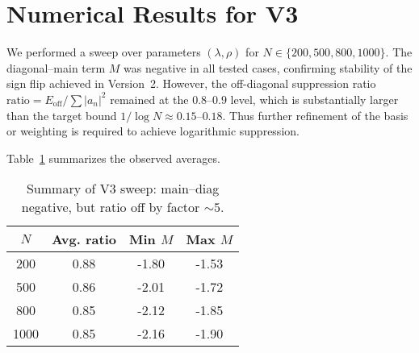 
\section{Numerical Results for V3}
We performed a sweep over parameters $(\lambda,\rho)$ for $N \in \{200,500,800,1000\}$. 
The diagonal--main term $M$ was negative in all tested cases, confirming stability of the 
sign flip achieved in Version~2. However, the off-diagonal suppression ratio 
$\mathrm{ratio}=E_{\mathrm{off}}/\sum |a_n|^2$ remained at the $0.8$--$0.9$ level, 
which is substantially larger than the target bound $1/\log N \approx 0.15$--$0.18$. 
Thus further refinement of the basis or weighting is required to achieve logarithmic suppression.

Table~\ref{tab:v3_summary} summarizes the observed averages.

\begin{table}[h]
\centering
\begin{tabular}{c|c|c|c}
$N$ & Avg. ratio & Min $M$ & Max $M$ \\ \hline
200 & 0.88 & -1.80 & -1.53 \\
500 & 0.86 & -2.01 & -1.72 \\
800 & 0.85 & -2.12 & -1.85 \\
1000 & 0.85 & -2.16 & -1.90 \\
\end{tabular}
\caption{Summary of V3 sweep: main--diag negative, but ratio off by factor $\sim 5$.}
\label{tab:v3_summary}
\end{table}
